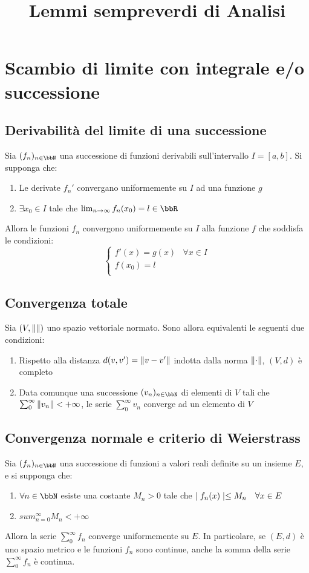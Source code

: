 \documentclass[a4paper,NoNotes,GeneralMath]{stdmdoc}
\begin{document}
	\title{Lemmi sempreverdi di Analisi}
	
	\section*{Scambio di limite con integrale e/o successione}
	\subsection*{Derivabilità del limite di una successione}
	Sia $(f_n)_{n \in \bbN}$ una successione di funzioni derivabili sull'intervallo $I = [a, b]$. Si supponga che:
	\begin{enumerate}
		\item Le derivate $f_n'$ convergano uniformemente su $I$ ad una funzione $g$
		\item $\exists x_0 \in I$ tale che $\lim_{n \rar \infty} f_n(x_0) = l \in \bbR$
	\end{enumerate}
	Allora le funzioni $f_n$ convergono uniformemente su $I$ alla funzione $f$ che soddisfa le condizioni:
	$$ \left\{ \begin{array}{cc} f'(x) = g(x) & \forall x \in I \\ f(x_0) = l & \\ \end{array} \right. $$
	
	\subsection*{Convergenza totale}
	Sia $(V, \| {} \|)$ uno spazio vettoriale normato. Sono allora equivalenti le seguenti due condizioni:
	\begin{enumerate}
		\item Rispetto alla distanza $d(v, v') = \| {v - v'} \|$ indotta dalla norma $\| {\cdot} \|$, $(V, d)$ è completo
		\item Data comunque una successione $(v_n)_{n \in \bbN}$ di elementi di $V$ tali che $\sum_0^\infty \| {v_n} \| < +\infty$, le serie $\sum_0^\infty v_n$ converge ad un elemento di $V$
	\end{enumerate}
	
	\subsection*{Convergenza normale e criterio di Weierstrass}
	Sia $(f_n)_{n \in \bbN}$ una successione di funzioni a valori reali definite su un insieme $E$, e si supponga che:
	\begin{enumerate}
		\item $\forall n \in \bbN$ esiste una costante $M_n > 0$ tale che $\mid f_n(x) \mid \le M_n \quad \forall x \in E$
		\item $sum_{n = 0}^\infty M_n < +\infty$
	\end{enumerate}
	Allora la serie $\sum_0^\infty f_n$ converge uniformemente su $E$. In particolare, se $(E, d)$ è uno spazio metrico e le funzioni $f_n$ sono continue, anche la somma della serie $\sum_0^\infty f_n$ è continua.
	
\end{document}
